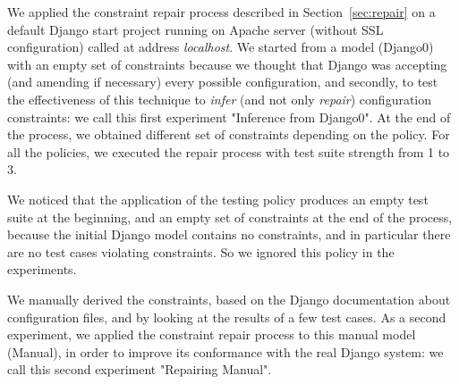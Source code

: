 \begin{tikzborder}{\cite{Gargantini16:validation}}
\begin{tikzborder}{\cite{gargantini_combinatorial_2017}}
\begin{tikzborder}{\cite{gargantini_combinatorial_2017}}
We applied the constraint repair process described in Section~\ref{sec:repair} on a default Django start project running on Apache server (without SSL configuration) called at address \emph{localhost}. We started from a model (Django0) with an empty set of constraints because we thought that Django was accepting (and amending if necessary) every possible configuration, and secondly, to test the effectiveness of this technique to \emph{infer} (and not only \emph{repair}) configuration constraints: we call this first experiment "\textsf{Inference from Django0}".
At the end of the process, we obtained different set of constraints depending on the policy.
For all the policies, we executed the repair process with test suite strength from 1 to 3.

We noticed that the application of the testing policy \cv produces an empty test suite at the beginning, and an empty set of constraints at the end of the process, because the initial Django model contains no constraints, and in particular there are no test cases violating constraints. So we ignored this policy in the experiments.

We manually derived the constraints, based on the Django documentation about configuration files, and by looking at the results of a few test cases. As a second experiment, we applied the constraint repair process to this manual model (\textsf{Manual}), in order to improve its conformance with the real Django system: we call this second experiment "\textsf{Repairing Manual}".\be


\end{tikzborder}
\end{tikzborder}
\end{tikzborder}
